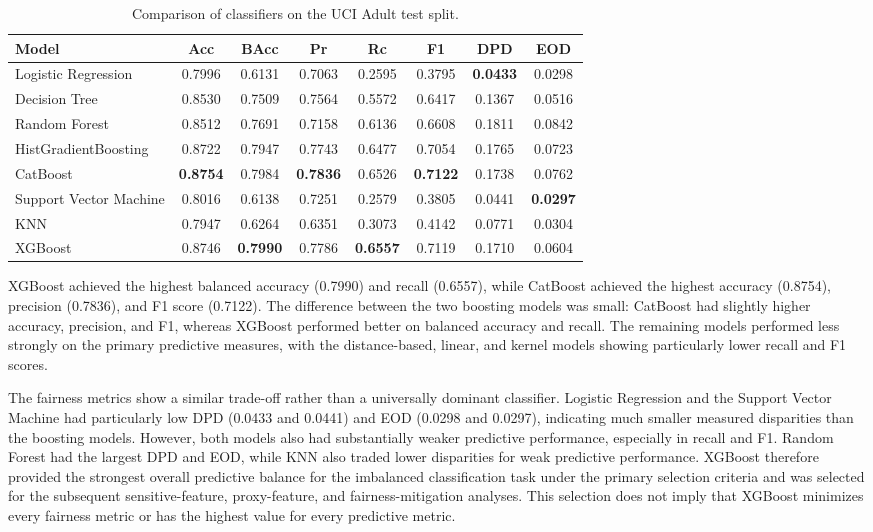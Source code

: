 \documentclass{article}
\begin{document}
\begin{table}[t]
  \centering
  \footnotesize
  \setlength{\tabcolsep}{3.5pt}
  \caption{Comparison of classifiers on the UCI Adult test split.}
  \label{tab:classifier-selection}
  \begin{tabular}{lccccccc}
    \toprule
    Model & Acc & BAcc & Pr & Rc & F1 & DPD & EOD \\
    \midrule
    Logistic Regression & 0.7996 & 0.6131 & 0.7063 & 0.2595 & 0.3795 & \textbf{0.0433} & 0.0298 \\
    Decision Tree & 0.8530 & 0.7509 & 0.7564 & 0.5572 & 0.6417 & 0.1367 & 0.0516 \\
    Random Forest & 0.8512 & 0.7691 & 0.7158 & 0.6136 & 0.6608 & 0.1811 & 0.0842 \\
    HistGradientBoosting & 0.8722 & 0.7947 & 0.7743 & 0.6477 & 0.7054 & 0.1765 & 0.0723 \\
    CatBoost & \textbf{0.8754} & 0.7984 & \textbf{0.7836} & 0.6526 & \textbf{0.7122} & 0.1738 & 0.0762 \\
    Support Vector Machine & 0.8016 & 0.6138 & 0.7251 & 0.2579 & 0.3805 & 0.0441 & \textbf{0.0297} \\
    KNN & 0.7947 & 0.6264 & 0.6351 & 0.3073 & 0.4142 & 0.0771 & 0.0304 \\
    XGBoost & 0.8746 & \textbf{0.7990} & 0.7786 & \textbf{0.6557} & 0.7119 & 0.1710 & 0.0604 \\
    \bottomrule
  \end{tabular}
\end{table}



XGBoost achieved the highest balanced accuracy (0.7990) and recall (0.6557),
while CatBoost achieved the highest accuracy (0.8754), precision (0.7836),
and F1 score (0.7122). The difference between the two boosting models was
small: CatBoost had slightly higher accuracy, precision, and F1, whereas
XGBoost performed better on balanced accuracy and recall. The remaining models
performed less strongly on the primary predictive measures, with the
distance-based, linear, and kernel models showing particularly lower recall
and F1 scores.

The fairness metrics show a similar trade-off rather than a universally
dominant classifier. Logistic Regression and the Support Vector Machine had
particularly low DPD (0.0433 and 0.0441) and EOD (0.0298 and 0.0297),
indicating much smaller measured disparities than the boosting models.
However, both models also had substantially weaker predictive performance,
especially in recall and F1. Random Forest had the largest DPD and EOD,
while KNN also traded lower disparities for weak predictive performance.
XGBoost therefore provided the strongest overall predictive balance for the
imbalanced classification task under the primary selection criteria and was
selected for the subsequent sensitive-feature, proxy-feature, and
fairness-mitigation analyses. This selection does not imply that XGBoost
minimizes every fairness metric or has the highest value for every predictive
metric.
\end{document}
